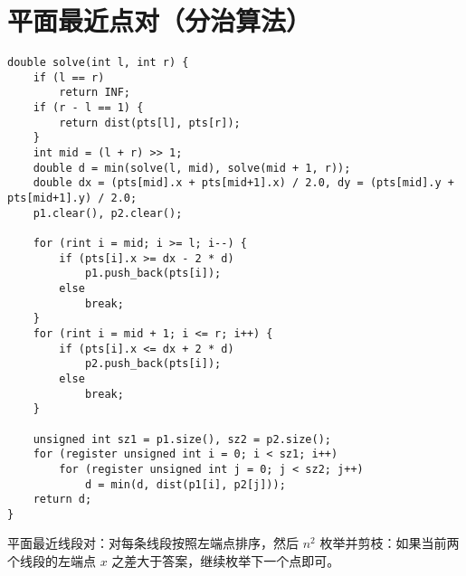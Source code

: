\section{平面最近点对（分治算法）}
\begin{verbatim}
double solve(int l, int r) {
    if (l == r)
        return INF;
    if (r - l == 1) {
        return dist(pts[l], pts[r]);
    }
    int mid = (l + r) >> 1;
    double d = min(solve(l, mid), solve(mid + 1, r));
    double dx = (pts[mid].x + pts[mid+1].x) / 2.0, dy = (pts[mid].y + pts[mid+1].y) / 2.0;
    p1.clear(), p2.clear();
    
    for (rint i = mid; i >= l; i--) {
        if (pts[i].x >= dx - 2 * d)
            p1.push_back(pts[i]);
        else
            break;
    }
    for (rint i = mid + 1; i <= r; i++) {
        if (pts[i].x <= dx + 2 * d)
            p2.push_back(pts[i]);
        else
            break;
    }
    
    unsigned int sz1 = p1.size(), sz2 = p2.size();
    for (register unsigned int i = 0; i < sz1; i++)
        for (register unsigned int j = 0; j < sz2; j++)
            d = min(d, dist(p1[i], p2[j]));
    return d;
}
\end{verbatim}

平面最近线段对：对每条线段按照左端点排序，然后 $n^2$ 枚举并剪枝：如果当前两个线段的左端点 $x$ 之差大于答案，继续枚举下一个点即可。
